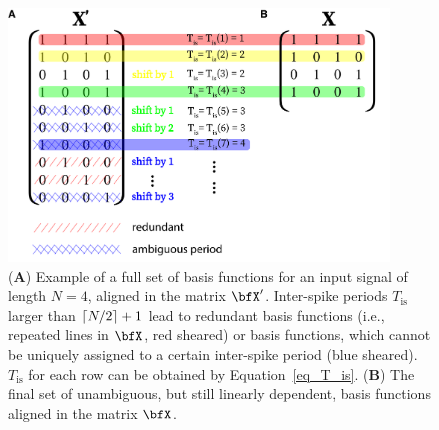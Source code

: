 \documentclass[entropy,article,accept,pdftex,moreauthors]{Definitions/mdpi}
\DeclarePairedDelimiter\ceil{\lceil}{\rceil}
\begin{document}
\begin{figure}[H]
\includegraphics[width=0.9\textwidth]{./figures/fig_tau_rr_basis_functions}
\caption{(\textbf{A}) Example of a full set of basis functions for an input signal of length $N=4$, aligned in the matrix $\bfX'$. Inter-spike periods $T_{\text{is}}$ larger 
than $\ceil*{N/2}+1$ lead to redundant basis functions (i.e., repeated lines in $\bfX$, red sheared) or basis functions, which cannot be uniquely assigned to a certain inter-spike period 
(blue sheared). $T_{\text{is}}$ for each row can be obtained by Equation~\eqref{eq_T_is}. (\textbf{B}) The final set of unambiguous, but still linearly dependent, basis functions aligned in the matrix $\bfX$.} \label{fig_tau_rr_basis_functions}
\end{figure}
\end{document}
